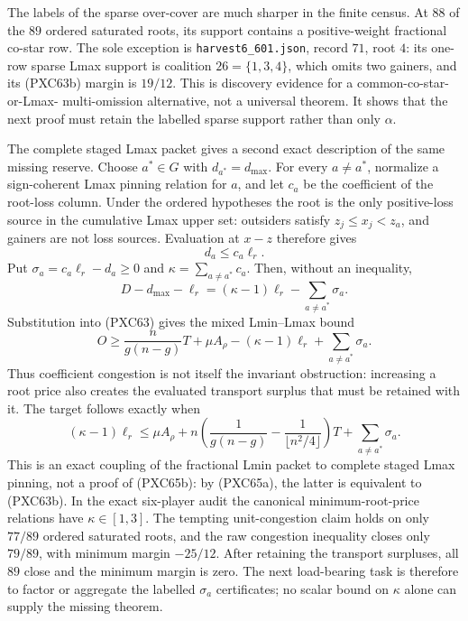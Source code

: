 \documentclass[11pt]{article}
\begin{document}
The labels of the sparse over-cover are much sharper in the finite census.
At $88$ of the $89$ ordered saturated roots, its support contains a
positive-weight fractional co-star row.  The sole exception is
\texttt{harvest6\_601.json}, record $71$, root $4$: its one-row sparse Lmax support is
coalition $26=\{1,3,4\}$, which omits two gainers, and its (PXC63b) margin is
$19/12$.  This is discovery evidence for a common-co-star-or-Lmax-
multi-omission alternative, not a universal theorem.  It shows that the next
proof must retain the labelled sparse support rather than only $\alpha$.

The complete staged Lmax packet gives a second exact description of the
same missing reserve.  Choose $a^*\in G$ with
$d_{a^*}=d_{\max}$.  For every $a\ne a^*$, normalize a sign-coherent Lmax
pinning relation for $a$, and let $c_a$ be the coefficient of the root-loss
column.  Under the ordered hypotheses the root is the only positive-loss
source in the cumulative Lmax upper set: outsiders satisfy
$z_j\le x_j<z_a$, and gainers are not loss sources.  Evaluation at $x-z$
therefore gives
\[
 d_a\le c_a\ell_r.
\]
Put $\sigma_a=c_a\ell_r-d_a\ge0$ and
$\kappa=\sum_{a\ne a^*}c_a$.  Then, without an inequality,
\[
 D-d_{\max}-\ell_r
   =(\kappa-1)\ell_r-\sum_{a\ne a^*}\sigma_a.       \tag{PXC65a}
\]
Substitution into (PXC63) gives the mixed Lmin--Lmax bound
\[
 \boxed{\qquad
 O\ge \frac{n}{g(n-g)}T+\mu A_\rho
       -(\kappa-1)\ell_r+\sum_{a\ne a^*}\sigma_a.
 \qquad}                                             \tag{PXC65}
\]
Thus coefficient congestion is not itself the invariant obstruction:
increasing a root price also creates the evaluated transport surplus that
must be retained with it.  The target follows exactly when
\[
 (\kappa-1)\ell_r\le \mu A_\rho+
 n\left(\frac1{g(n-g)}-\frac1{\lfloor n^2/4\rfloor}\right)T
 +\sum_{a\ne a^*}\sigma_a.                          \tag{PXC65b}
\]
This is an exact coupling of the fractional Lmin packet to complete staged
Lmax pinning, not a proof of (PXC65b): by (PXC65a), the latter is equivalent
to (PXC63b).  In the exact six-player audit the canonical minimum-root-price
relations have $\kappa\in[1,3]$.  The tempting unit-congestion claim holds
on only $77/89$ ordered saturated roots, and the raw congestion inequality
closes only $79/89$, with minimum margin $-25/12$.  After retaining the
transport surpluses, all $89$ close and the minimum margin is zero.  The next
load-bearing task is therefore to factor or aggregate the labelled
$\sigma_a$ certificates; no scalar bound on $\kappa$ alone can supply the
missing theorem.
\end{document}
